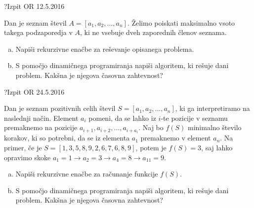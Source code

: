 \begin{naloga}{?}{Izpit OR 12.5.2016}
\begin{vprasanje}
Dan je seznam števil $A = [a_1, a_2, \dots, a_n]$.
Želimo poiskati maksimalno vsoto takega podzaporedja v $A$,
ki ne vsebuje dveh zaporednih členov seznama.

\begin{enumerate}[(a)]
\item Napiši rekurzivne enačbe za reševanje opisanega problema.

\item S pomočjo dinamičnega programiranja napiši algoritem,
ki rešuje dani problem.
Kakšna je njegova časovna zahtevnost?
\end{enumerate}
\end{vprasanje}
\begin{odgovor}
\end{odgovor}
\end{naloga}


\begin{naloga}{?}{Izpit OR 24.5.2016}
\begin{vprasanje}
Dan je seznam pozitivnih celih števil $S = [a_1, a_2, \dots, a_n]$,
ki ga interpretiramo na naslednji način.
Element $a_i$ pomeni,
da se lahko iz $i$-te pozicije v seznamu
premaknemo na pozicije $a_{i+1}, a_{i+2}, \dots, a_{i+a_i}$.
Naj bo $f(S)$ minimalno število korakov,
ki so potrebni, da se iz elementa $a_1$ premaknemo v element $a_n$.
Na primer, če je $S = [1, 3, 5, 8, 9, 2, 6, 7, 6, 8, 9]$,
potem je $f(S) = 3$,
saj lahko opravimo skoke $a_1 = 1 \to a_2 = 3 \to a_4 = 8 \to a_{11} = 9$.

\begin{enumerate}[(a)]
\item Napiši rekurzivne enačbe za računanje funkcije $f(S)$.

\item S pomočjo dinamičnega programiranja napiši algoritem,
ki rešuje dani problem.
Kakšna je njegova časovna zahtevnost?
\end{enumerate}
\end{vprasanje}
\begin{odgovor}
\end{odgovor}
\end{naloga}


